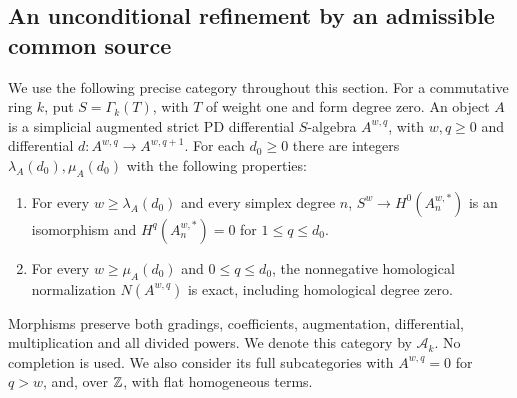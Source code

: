 \subsection{An unconditional refinement by an admissible common source}
\label{sec:A-paths}

We use the following precise category throughout this section. For a
commutative ring $k$, put $S=\Gamma_k(T)$, with $T$ of weight one
and form degree zero. An object $A$ is a simplicial augmented strict
PD differential $S$-algebra $A^{w,q}$, with $w,q\geq0$ and differential
$d:A^{w,q}\to A^{w,q+1}$. For each $d_0\geq0$ there are integers
$\lambda_A(d_0),\mu_A(d_0)$ with the following properties:
\begin{enumerate}
\item For every $w\geq\lambda_A(d_0)$ and every simplex degree $n$,
$S^w\to H^0(A_n^{w,*})$ is an isomorphism and
$H^q(A_n^{w,*})=0$ for $1\leq q\leq d_0$.
\item For every $w\geq\mu_A(d_0)$ and $0\leq q\leq d_0$, the
nonnegative homological normalization $N(A^{w,q})$ is exact, including
homological degree zero.
\end{enumerate}
Morphisms preserve both gradings, coefficients, augmentation,
differential, multiplication and all divided powers. We denote this
category by $\mathcal A_k$. No completion is used. We also consider its
full subcategories with $A^{w,q}=0$ for $q>w$, and, over $\mathbb Z$, with
flat homogeneous terms.

